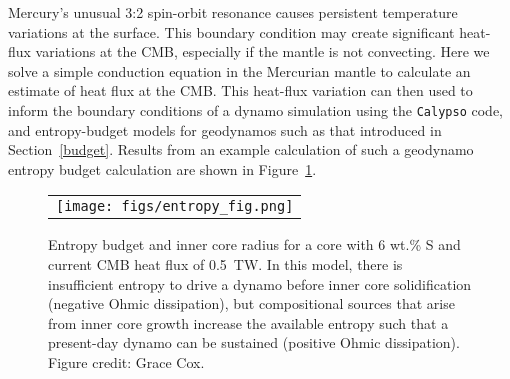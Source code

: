 Mercury's unusual 3:2 spin-orbit resonance causes persistent temperature variations
at the surface.  This boundary condition may create significant heat-flux variations
at the CMB, especially if the mantle is not convecting.  Here we solve a simple
conduction equation in the Mercurian mantle to calculate an estimate of heat flux at
the CMB.  This heat-flux variation can then used to inform the boundary conditions of
a dynamo simulation using the \texttt{Calypso} code, and entropy-budget models for
geodynamos such as that introduced in Section~\ref{budget}. Results from an example
calculation of such a geodynamo entropy budget calculation are shown in
Figure~\ref{entropy}.



 \begin{figure}[h] %
   \centering
\begin{tabular}{c}
 \texttt{[image: figs/entropy\_fig.png]} 
\end{tabular}
\caption{Entropy budget and inner core radius for a core with 6 wt.\% S and
  current CMB heat flux of 0.5~TW. In this model, there is insufficient entropy to
  drive a dynamo before inner core solidification (negative Ohmic dissipation), but
  compositional sources that arise from inner core growth increase the available
entropy such that a present-day dynamo can be sustained (positive Ohmic dissipation).
Figure credit: Grace Cox. }
\label{entropy}
\end{figure}
